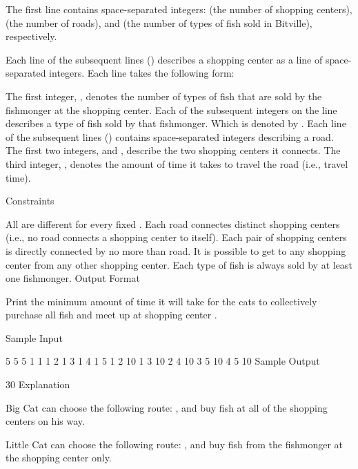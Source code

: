 \documentclass[12pt]{article}
\begin{document}
The first line contains space-separated integers: (the number of
shopping centers), (the number of roads), and (the number of types of
fish sold in Bitville), respectively.

Each line of the subsequent lines () describes a shopping center as a
line of space-separated integers. Each line takes the following form:

The first integer, , denotes the number of types of fish that are sold
by the fishmonger at the shopping center.  Each of the subsequent
integers on the line describes a type of fish sold by that
fishmonger. Which is denoted by .  Each line of the subsequent lines
() contains space-separated integers describing a road. The first two
integers, and , describe the two shopping centers it connects. The
third integer, , denotes the amount of time it takes to travel the
road (i.e., travel time).

Constraints

All are different for every fixed .  Each road connectes distinct
shopping centers (i.e., no road connects a shopping center to itself).
Each pair of shopping centers is directly connected by no more than
road.  It is possible to get to any shopping center from any other
shopping center.  Each type of fish is always sold by at least one
fishmonger.  Output Format

Print the minimum amount of time it will take for the cats to
collectively purchase all fish and meet up at shopping center .

Sample Input

5 5 5
1 1
1 2
1 3
1 4
1 5
1 2 10
1 3 10
2 4 10
3 5 10
4 5 10
Sample Output

30
Explanation

Big Cat can choose the following route: , and buy fish at all of the shopping centers on his way.

Little Cat can choose the following route: , and buy fish from the fishmonger at the shopping center only.
\end{document}
